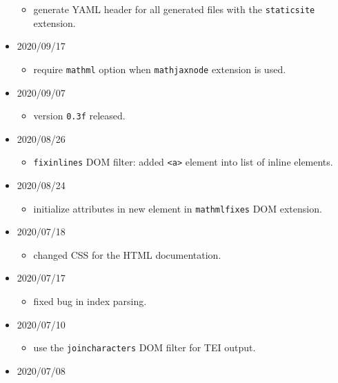 \begin{itemize}
  \begin{itemize}
  \tightlist
  \item
    generate YAML header for all generated files with the
    \texttt{staticsite} extension.
  \end{itemize}
\item
  2020/09/17

  \begin{itemize}
  \tightlist
  \item
    require \texttt{mathml} option when \texttt{mathjaxnode} extension
    is used.
  \end{itemize}
\item
  2020/09/07

  \begin{itemize}
  \tightlist
  \item
    version \texttt{0.3f} released.
  \end{itemize}
\item
  2020/08/26

  \begin{itemize}
  \tightlist
  \item
    \texttt{fixinlines} DOM filter: added
    \texttt{\textless{}a\textgreater{}} element into list of inline
    elements.
  \end{itemize}
\item
  2020/08/24

  \begin{itemize}
  \tightlist
  \item
    initialize attributes in new element in \texttt{mathmlfixes} DOM
    extension.
  \end{itemize}
\item
  2020/07/18

  \begin{itemize}
  \tightlist
  \item
    changed CSS for the HTML documentation.
  \end{itemize}
\item
  2020/07/17

  \begin{itemize}
  \tightlist
  \item
    fixed bug in index parsing.
  \end{itemize}
\item
  2020/07/10

  \begin{itemize}
  \tightlist
  \item
    use the \texttt{joincharacters} DOM filter for TEI output.
  \end{itemize}
\item
  2020/07/08


\end{itemize}
